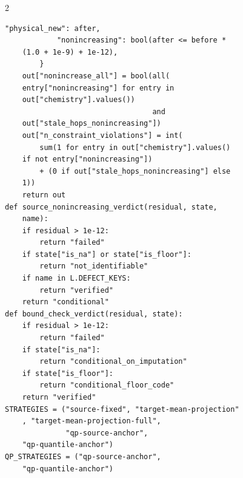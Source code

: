 \begin{multicols}{2}
\begin{Verbatim}[fontsize=\scriptsize]
    "physical_new": after,
            "nonincreasing": bool(after <= before *
    (1.0 + 1e-9) + 1e-12),
        }
    out["nonincrease_all"] = bool(all(
    entry["nonincreasing"] for entry in
    out["chemistry"].values())
                                  and
    out["stale_hops_nonincreasing"])
    out["n_constraint_violations"] = int(
        sum(1 for entry in out["chemistry"].values()
    if not entry["nonincreasing"])
        + (0 if out["stale_hops_nonincreasing"] else
    1))
    return out
def source_nonincreasing_verdict(residual, state,
    name):
    if residual > 1e-12:
        return "failed"
    if state["is_na"] or state["is_floor"]:
        return "not_identifiable"
    if name in L.DEFECT_KEYS:
        return "verified"
    return "conditional"
def bound_check_verdict(residual, state):
    if residual > 1e-12:
        return "failed"
    if state["is_na"]:
        return "conditional_on_imputation"
    if state["is_floor"]:
        return "conditional_floor_code"
    return "verified"
STRATEGIES = ("source-fixed", "target-mean-projection"
    , "target-mean-projection-full",
              "qp-source-anchor",
    "qp-quantile-anchor")
QP_STRATEGIES = ("qp-source-anchor",
    "qp-quantile-anchor")
\end{Verbatim}

\end{multicols}